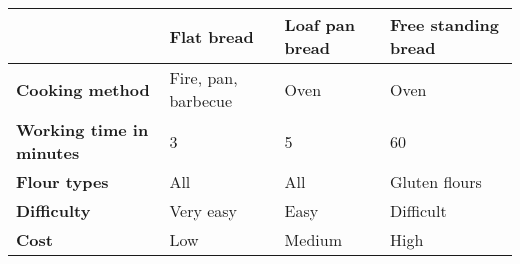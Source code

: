 


\begin{tabular}{|l|l|l|l|}
\hline
                                 & \textbf{Flat bread} & \textbf{Loaf pan bread} & \textbf{Free standing bread} \\ \hline
\textbf{Cooking method}          & Fire, pan, barbecue & Oven                    & Oven                         \\ \hline
\textbf{Working time in minutes} & 3                   & 5                       & 60                           \\ \hline
\textbf{Flour types}             & All                 & All                     & Gluten flours                \\ \hline
\textbf{Difficulty}              & Very easy           & Easy                    & Difficult                    \\ \hline
\textbf{Cost}                    & Low                 & Medium                  & High                         \\ \hline
\end{tabular}

